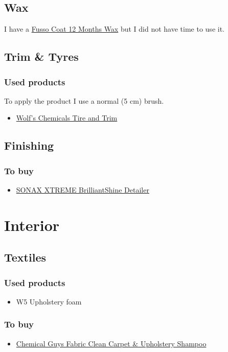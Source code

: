 \documentclass[12pt, a4paper, portrait]{article}
\begin{document}
\subsection{Wax}
I have a \href{http://www.soft99.co.jp/english/products/carcare/wax/fusso_coat_12.html}{Fusso Coat 12 Months Wax} but I did not have time to use it.

\subsection{Trim \& Tyres}
\subsubsection{Used products}
To apply the product I use a normal (5 cm) brush.
\begin{itemize}
\item{\href{http://wolfschemicals.com/shop/shop/dressing2/Tire_and_Trim_Gel}{Wolf's Chemicals Tire and Trim}}
\end{itemize}

\subsection{Finishing}
\subsubsection{To buy}
\begin{itemize}
\item{\href{https://www.sonax.com/Product-Search/(location)/19404-SONAX-XTREME-BrilliantShine-Detailer}{SONAX XTREME BrilliantShine Detailer}}
\end{itemize}

\pagebreak
\section{Interior}
\subsection{Textiles}
\subsubsection{Used products}
\begin{itemize}
\item{W5 Upholstery foam}
\end{itemize}
\subsubsection{To buy}
\begin{itemize}
\item{\href{https://www.chemicalguys.com/Fabric_Clean_Carpet_Upholstery_Shampoo_16_oz_p/cws20316.htm}{Chemical Guys Fabric Clean Carpet \& Upholstery Shampoo}}
\end{itemize}
\end{document}
